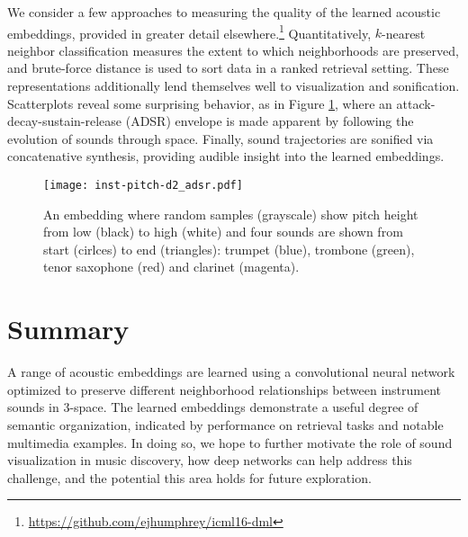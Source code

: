 \documentclass{article}
\begin{document}
We consider a few approaches to measuring the quality of the learned acoustic embeddings, provided in greater detail elsewhere.\footnote{\url{https://github.com/ejhumphrey/icml16-dml}}
Quantitatively, $k$-nearest neighbor classification measures the extent to which neighborhoods are preserved, and brute-force distance is used to sort data in a ranked retrieval setting.
These representations additionally lend themselves well to visualization and sonification.
Scatterplots reveal some surprising behavior, as in Figure \ref{fig:asdr}, where an attack-decay-sustain-release (ADSR) envelope is made apparent by following the evolution of sounds through space.
Finally, sound trajectories are sonified via concatenative synthesis, providing audible insight into the learned embeddings.



\begin{figure}[!t]
\vskip -0.35in
\begin{center}
\centerline{\texttt{[image: inst-pitch-d2\_adsr.pdf]}}
\vskip -0.2in
\caption{An embedding where random samples (grayscale) show pitch height from low (black) to high (white) and four sounds are shown from start (cirlces) to end (triangles): trumpet (blue), trombone (green), tenor saxophone (red) and clarinet (magenta).}
\label{fig:asdr}
\end{center}
\vskip -0.25in
\end{figure}



\section{Summary}

A range of acoustic embeddings are learned using a convolutional neural network optimized to preserve different neighborhood relationships between instrument sounds in 3-space.
The learned embeddings demonstrate a useful degree of semantic organization, indicated by performance on retrieval tasks and notable multimedia examples.
In doing so, we hope to further motivate the role of sound visualization in music discovery, how deep networks can help address this challenge, and the potential this area holds for future exploration.




\end{document}
